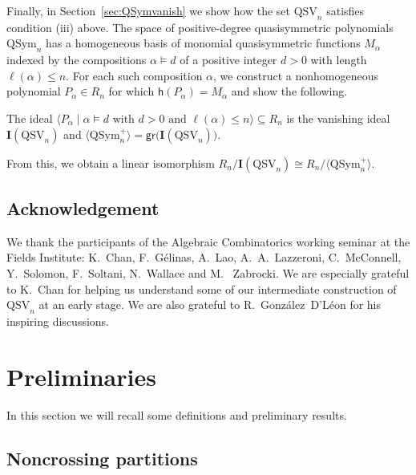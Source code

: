 \documentclass[submission]{FPSAC2024}
\theoremstyle{definition}
\theoremstyle{remark}
\numberwithin{equation}{section}
\newenvironment{introthm}[1]{
  \renewcommand\theequation{#1}
  \thm
}{\endthm}
\newcommand{\QSym}{\mathrm{QSym}}
\newcommand{\QSV}{\mathrm{QSV}}
\begin{document}
Finally, in Section~\ref{sec:QSymvanish} we show how the set $\QSV_{n}$ satisfies condition (iii) above.  
The space of positive-degree quasisymmetric polynomials $\QSym_{n}$ has a homogeneous basis of monomial quasisymmetric functions $M_{\alpha}$ indexed by the compositions $\alpha \vDash d$ of a positive integer $d > 0$ with length $\ell(\alpha) \le n$.  
For each such composition $\alpha$, we construct a nonhomogeneous polynomial $P_{\alpha} \in R_{n}$ for which $\mathsf{h}(P_{\alpha}) = M_{\alpha}$ and show the following.

\begin{introthm}{\ref{thm:vanishingQSV}}
The ideal $\langle P_{\alpha} \;|\; \text{$\alpha \vDash d $ with $d> 0$ and $\ell(\alpha) \le n$} \rangle \subseteq R_n$ is the vanishing ideal $\mathbf{I}(\QSV_n)$ and 
$ \langle \QSym_{n}^{+} \rangle = \mathsf{gr}\big(\mathbf{I}(\QSV_{n})\big).$
\end{introthm}

From this, we obtain a linear isomorphism
$R_{n}\big/\mathbf{I}(\QSV_{n}) \cong R_{n}\big/\langle \QSym_{n}^{+} \rangle.$

\subsection{Acknowledgement} 
We thank the participants of the Algebraic Combinatorics working seminar at the Fields Institute: K.~Chan, F.~G\'elinas, A.~Lao, A.~A.~Lazzeroni, C.~McConnell, Y.~Solomon, F.~Soltani,  N.~Wallace and 
M.~ Zabrocki. We are especially grateful to K.~Chan for helping us understand some of our intermediate construction of $\QSV_n$ at an early stage.
We are also grateful to R.~Gonz\'alez~D'L\'eon for his  inspiring discussions.%




\section{Preliminaries}

In this section we will recall some definitions and preliminary results.

\subsection{Noncrossing partitions}
\label{sec:ncp}
\end{document}
